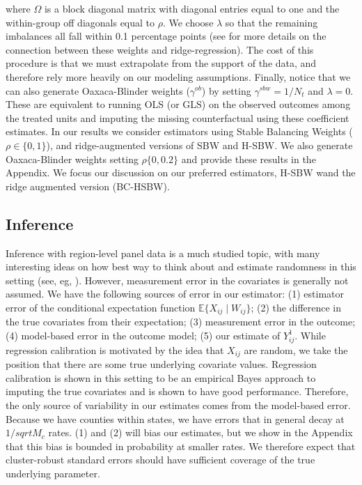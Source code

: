 \documentclass[12pt]{article}
\begin{document}
where $\Omega$ is a block diagonal matrix with diagonal entries equal to one and the within-group off diagonals equal to $\rho$. We choose $\lambda$ so that the remaining imbalances all fall within 0.1 percentage points (see \cite{ben2018augmented} for more details on the connection between these weights and ridge-regression). The cost of this procedure is that we must extrapolate from the support of the data, and therefore rely more heavily on our modeling assumptions. Finally, notice that we can also generate Oaxaca-Blinder weights ($\gamma^{ob}$) by setting $\gamma^{sbw} = 1/N_t$ and $\lambda = 0$. These are equivalent to running OLS (or GLS) on the observed outcomes among the treated units and imputing the missing counterfactual using these coefficient estimates. In our results we consider estimators using Stable Balancing Weights ($\rho \in \{0, 1\}$), and ridge-augmented versions of SBW and H-SBW. We also generate Oaxaca-Blinder weights setting $\rho \{0, 0.2\}$ and provide these results in the Appendix. We focus our discussion on our preferred estimators, H-SBW wand the ridge augmented version (BC-HSBW).

\subsection{Inference}

Inference with region-level panel data is a much studied topic, with many interesting ideas on how best way to think about and estimate randomness in this setting (see, eg, \cite{chernozhukov2017exact}). However, measurement error in the covariates is generally not assumed. We have the following sources of error in our estimator: (1) estimator error of the conditional expectation function $\mathbb{E}\{X_{ij} \mid W_{ij}\}$; (2) the difference in the true covariates from their expectation; (3) measurement error in the outcome; (4) model-based error in the outcome model; (5) our estimate of $Y_{ij}^1$. While regression calibration is motivated by the idea that $X_{ij}$ are random, we take the position that there are some true underlying covariate values. Regression calibration is shown in this setting to be an empirical Bayes approach to imputing the true covariates and is shown to have good performance. Therefore, the only source of variability in our estimates comes from the model-based error. Because we have counties within states, we have errors that in general decay at $1/sqrt{M_c}$ rates. (1) and (2) will bias our estimates, but we show in the Appendix that this bias is bounded in probability at smaller rates. We therefore expect that cluster-robust standard errors should have sufficient coverage of the true underlying parameter. 
\end{document}
